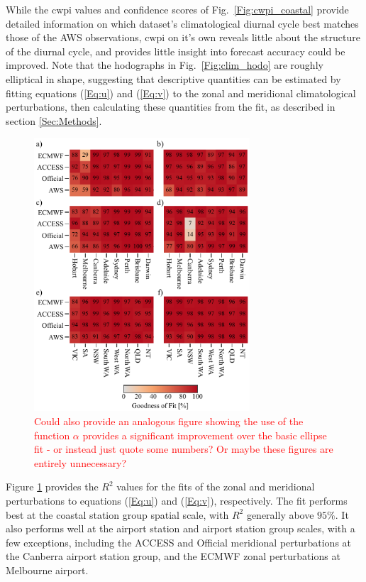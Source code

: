 \documentclass{ametsoc}
\begin{document}
While the $\text{cwpi}$ values and confidence scores of Fig.~\ref{Fig:cwpi_coastal} provide detailed information on which dataset's climatological diurnal cycle best matches those of the AWS observations, $\text{cwpi}$ on it's own reveals little about the structure of the diurnal cycle, and provides little insight into forecast accuracy could be improved. Note that the hodographs in Fig.~\ref{Fig:clim_hodo} are roughly elliptical in shape, suggesting that descriptive quantities can be estimated by fitting equations (\ref{Eq:u}) and (\ref{Eq:v}) to the zonal and meridional climatological perturbations, then calculating these quantities from the fit, as described in section \ref{Sec:Methods}. 

\begin{figure}
\centering
\includegraphics[width=19pc]{r_squared.pdf}
\caption{\textcolor{red}{Could also provide an analogous figure showing the use of the function $\alpha$ provides a significant improvement over the basic ellipse fit - or instead just quote some numbers? Or maybe these figures are entirely unnecessary?}}
\label{Fig:r_squared}
\end{figure}

Figure \ref{Fig:r_squared} provides the $R^2$ values for the fits of the zonal and meridional perturbations to equations (\ref{Eq:u}) and (\ref{Eq:v}), respectively. The fit performs best at the coastal station group spatial scale, with $R^2$ generally above $95\%$. It also performs well at the airport station and airport station group scales, with a few exceptions, including the ACCESS and Official meridional perturbations at the Canberra airport station group, and the ECMWF zonal perturbations at Melbourne airport. 
\end{document}
